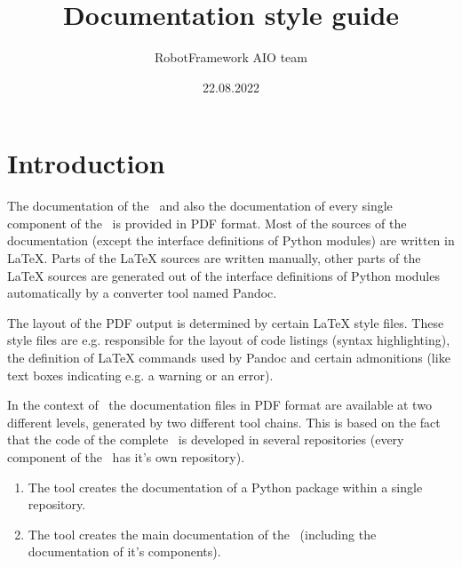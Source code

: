 \documentclass[a4paper,10pt]{report}
\author{RobotFramework AIO team}
\title{Documentation style guide}
\date{22.08.2022}
\begin{document}
\hypersetup{pageanchor=false}

\maketitle

\clearpage
{}
\tableofcontents

\clearpage
{}

\hypersetup{pageanchor=true}


\chapter{Introduction}

The documentation of the \rfw\ and also the documentation of every single component of the \rfw\ is provided in PDF format.
Most of the sources of the documentation (except the interface definitions of Python modules) are written in LaTeX.
Parts of the LaTeX sources are written manually, other parts of the LaTeX sources are generated out of the interface definitions of Python modules
automatically by a converter tool named Pandoc.

The layout of the PDF output is determined by certain LaTeX style files. These style files are e.g. responsible for the layout of code listings (syntax highlighting),
the definition of LaTeX commands used by Pandoc and certain admonitions (like text boxes indicating e.g. a warning or an error).

In the context of \rfw\ the documentation files in PDF format are available at two different levels, generated by two different tool chains. This is based on the
fact that the code of the complete \rfw\ is developed in several repositories (every component of the \rfw\ has it's own repository).

\begin{enumerate}

   \item The tool  creates the documentation of a Python package within a single repository.

   \item The tool  creates the main documentation of the \rfw\ (including the documentation of it's components).

\end{enumerate}
\end{document}
